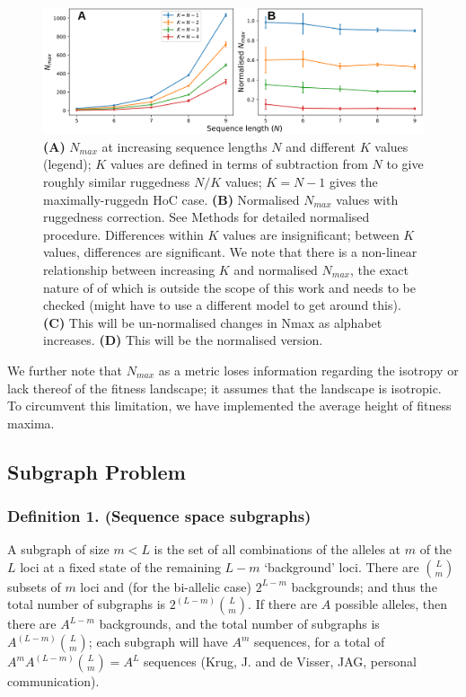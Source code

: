 \documentclass[10pt, reqno]{amsart}
\begin{document}
\begin{figure}[h]
\includegraphics[scale=0.6]{images/seq_len_vs_nmax_figure.png}
\caption{\textbf{(A)} $N_{max}$ at increasing sequence lengths $N$ and different $K$ values (legend); $K$ values are defined in terms of subtraction from $N$ to give roughly similar ruggedness $N/K$ values; $K = N-1$ gives the maximally-ruggedn HoC case. \textbf{(B)} Normalised $N_{max}$ values with ruggedness correction. See Methods for detailed normalised procedure. Differences within $K$ values are insignificant; between $K$ values, differences are significant. We note that there is a non-linear relationship between increasing $K$ and normalised $N_{max}$, the exact nature of of which is outside the scope of this work and needs to be checked (might have to use a different model to get around this). \textbf{(C)} This will be un-normalised changes in Nmax as alphabet increases. \textbf{(D)} This will be the normalised version.}

\end{figure}






We further note that $N_{max}$ as a metric loses information regarding the isotropy or lack thereof of the fitness landscape; it assumes that the landscape is isotropic. To circumvent this limitation, we have implemented the average height of fitness maxima. 













\subsection{Subgraph Problem}

\subsubsection*{Definition 1. (Sequence space subgraphs)} A subgraph of size $m < L$ is the set of all combinations of the alleles at $m$ of the $L$ loci at a fixed state of the remaining $L-m$ `background' loci. There are ${L \choose m}$ subsets of $m$ loci and (for the bi-allelic case) $2^{L-m}$ backgrounds; and thus the total number of subgraphs is $2^{(L-m)}{L \choose m}$. If there are $A$ possible alleles, then there are $A^{L-m}$ backgrounds, and the total number of subgraphs is $A^{(L-m)}{L \choose m}$; each subgraph will have $A^m$ sequences, for a total of $A^m A^{(L-m)}{L \choose m} = A^L$ sequences (Krug, J. and de Visser, JAG, personal communication). \\
\end{document}
